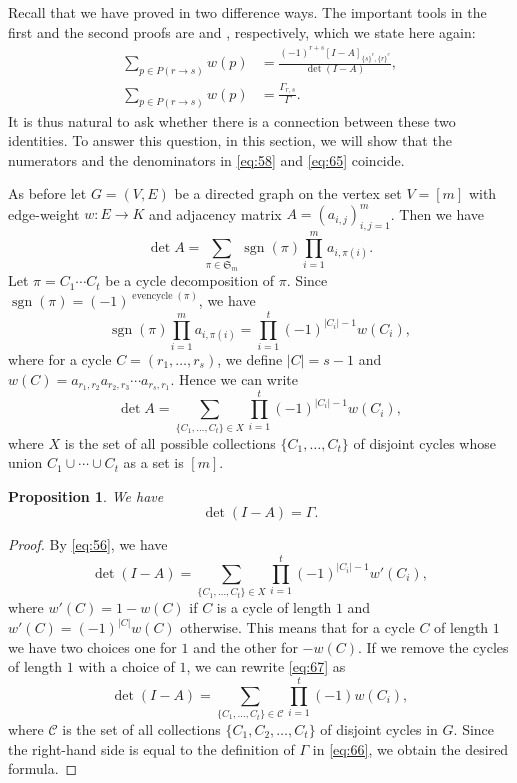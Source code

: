 \documentclass[oneside]{book}
\numberwithin{equation}{section}
\newtheorem{prop}[thm]{Proposition}
\theoremstyle{definition}
\newcommand\evencycle{\operatorname{evencycle}}
\newcommand\sgn{\operatorname{sgn}}
\newcommand\sym{\mathfrak{S}}
\begin{document}
Recall that we have proved  in two difference ways. The
important tools in the first and the second proofs are 
and , respectively, which we state here again:
\begin{align}\label{eq:58}
  \sum_{p\in P(r\to s)}  w(p) &= \frac{(-1)^{r+s} [I-A]_{\{s\}^c,\{r\}^c}}{\det(I-A)},\\
  \label{eq:65}
    \sum_{p\in P(r\to s)}  w(p) &= \frac{\Gamma_{r,s}}{\Gamma}.
\end{align}
It is thus natural to ask whether there is a connection between these
two identities. To answer this question, in this section, we will show
that the numerators and the denominators in \eqref{eq:58} and
\eqref{eq:65} coincide.

As before let \( G=(V,E) \) be a directed graph on the vertex set
\( V=[m] \) with edge-weight \( w:E\to K \) and adjacency matrix
\( A = (a_{i,j})_{i,j=1}^m \).
Then we have
\[
  \det A = \sum_{\pi\in \sym_m} \sgn(\pi) \prod_{i=1}^{m} a_{i,\pi(i)}.
\]
Let \( \pi = C_1 \cdots C_t \) be a cycle decomposition of
\( \pi \). Since \( \sgn(\pi) = (-1)^{\evencycle(\pi)} \),
we have
\[
  \sgn(\pi) \prod_{i=1}^{m} a_{i,\pi(i)}
  = \prod_{i=1}^{t} (-1)^{|C_i|-1} w(C_i),
\]
where for a cycle \( C=(r_1,\dots,r_s) \), we define
\( |C|=s-1 \) and
\( w(C) = a_{r_1,r_2}a_{r_2,r_3}\cdots a_{r_s,r_1} \). Hence we can
write
\begin{equation}\label{eq:56}
  \det A = \sum_{\{C_1 , \dots , C_t\}\in X}
  \prod_{i=1}^{t} (-1)^{|C_i|-1} w(C_i),
\end{equation}
where \( X \) is the set of all possible collections
\( \{ C_1 , \dots , C_t \} \) of disjoint cycles whose union
\( C_1 \cup \cdots \cup C_t \) as a set is \( [m] \).

\begin{prop}\label{pro:4}
  We have
\[
  \det (I-A) = \Gamma.
\]
\end{prop}

\begin{proof}
  By \eqref{eq:56}, we have
\begin{equation}\label{eq:67}
    \det (I-A) = \sum_{\{C_1 , \dots , C_t\}\in X}
  \prod_{i=1}^{t} (-1)^{|C_i|-1} w'(C_i),
\end{equation}
where \( w'(C) = 1-w(C) \) if \( C \) is a cycle of length \( 1 \) and
\( w'(C) = (-1)^{|C|} w(C) \) otherwise. This means that for a cycle
\( C \) of length \( 1 \) we have two choices one for \( 1 \) and the
other for \( -w(C) \).
If we remove the cycles of length \( 1 \) with a choice of \( 1 \),
we can rewrite \eqref{eq:67} as
\[
  \det (I-A) = \sum_{\{C_1 , \dots , C_t\}\in \mathcal{C}}
  \prod_{i=1}^{t} (-1) w(C_i),
\]
where \( \mathcal{C} \) is the set of all collections
\( \{C_1, C_2,\dots,C_t\} \) of disjoint cycles in \( G \). Since the
right-hand side is equal to the definition of \( \Gamma \) in
\eqref{eq:66}, we obtain the desired formula.
\end{proof}
\end{document}

